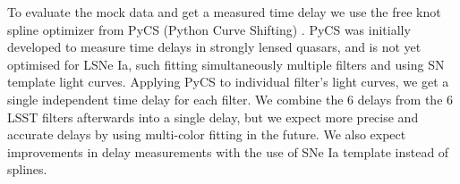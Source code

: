 To evaluate the mock data and get a measured time delay we use the
free knot spline optimizer from PyCS (Python Curve Shifting)
\citep{2013:Tewesb,Bonvin:2015jia}. PyCS was initially developed to
measure time delays in strongly lensed quasars, and is not yet
optimised for LSNe Ia, such fitting simultaneously multiple filters
and using SN template light curves.  Applying PyCS to individual
filter's light curves, we get a single independent time delay for each
filter.  We combine the 6 delays from the 6 LSST filters afterwards
into a single delay, but we expect more precise and accurate delays by
using multi-color fitting in the future. We also expect improvements
in delay measurements with the use of SNe Ia template instead of
splines.  



